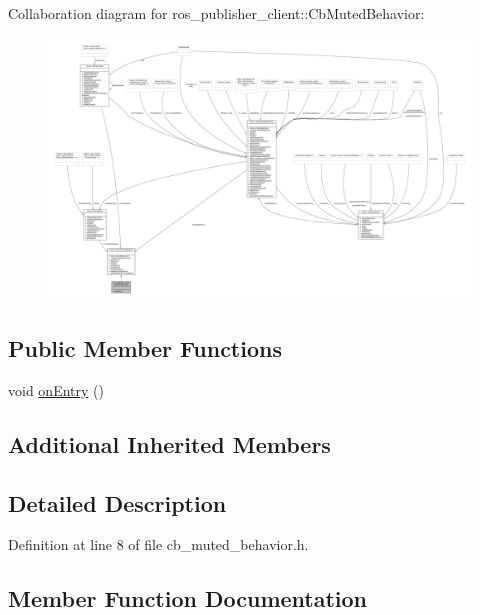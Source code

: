 Collaboration diagram for ros\+\_\+publisher\+\_\+client\+:\+:Cb\+Muted\+Behavior\+:
\nopagebreak
\begin{figure}[H]
\begin{center}
\leavevmode
\includegraphics[width=350pt]{classros__publisher__client_1_1CbMutedBehavior__coll__graph}
\end{center}
\end{figure}
\subsection*{Public Member Functions}
\begin{DoxyCompactItemize}
\item 
void \hyperlink{classros__publisher__client_1_1CbMutedBehavior_ab64661323ee678ef85c0f12409b56789}{on\+Entry} ()
\end{DoxyCompactItemize}
\subsection*{Additional Inherited Members}


\subsection{Detailed Description}


Definition at line 8 of file cb\+\_\+muted\+\_\+behavior.\+h.



\subsection{Member Function Documentation}
